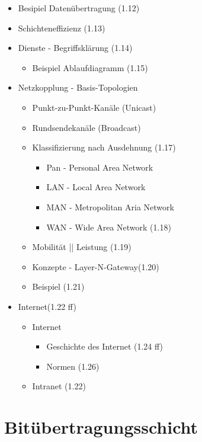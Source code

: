 \begin{itemize}
\begin{itemize}
	\end{itemize}
	\item Besipiel Datenübertragung (1.12)
	\item Schichteneffizienz (1.13)
	\item Dienste - Begriffsklärung (1.14)
	\begin{itemize}
		\item Beispiel Ablaufdiagramm (1.15)
	\end{itemize}
	\item Netzkopplung - Basis-Topologien
	\begin{itemize}
		\item Punkt-zu-Punkt-Kanäle (Unicast)
		\item Rundsendekanäle (Broadcast)
		\item Klassifizierung nach Ausdehnung (1.17)
		\begin{itemize}
			\item Pan - Personal Area Network
			\item LAN - Local Area Network
			\item MAN - Metropolitan Aria Network
			\item WAN - Wide Area Network (1.18)
		\end{itemize}
		\item Mobilität || Leistung (1.19)
		\item Konzepte - Layer-N-Gateway(1.20)
		\item Beispiel (1.21)
	\end{itemize}
	\item Internet(1.22 ff)
	\begin{itemize}
		\item Internet
		\begin{itemize}
			\item Geschichte des Internet (1.24 ff)
			\item Normen (1.26)
		\end{itemize}
		\item Intranet (1.22)
	\end{itemize}
\end{itemize}

\section{Bitübertragungsschicht}

